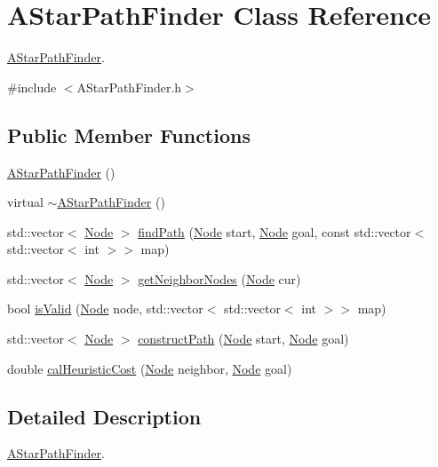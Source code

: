 \hypertarget{classAStarPathFinder}{}\section{A\+Star\+Path\+Finder Class Reference}
\label{classAStarPathFinder}


\hyperlink{classAStarPathFinder}{A\+Star\+Path\+Finder}.  




{\ttfamily \#include $<$A\+Star\+Path\+Finder.\+h$>$}

\subsection*{Public Member Functions}
\begin{DoxyCompactItemize}
\item 
\hyperlink{classAStarPathFinder_adfae926e32955b2c3e43909ad7961a9a}{A\+Star\+Path\+Finder} ()
\item 
virtual \hyperlink{classAStarPathFinder_a3b92e1a0571086969027599fc2a488e5}{$\sim$\+A\+Star\+Path\+Finder} ()
\item 
std\+::vector$<$ \hyperlink{classNode}{Node} $>$ \hyperlink{classAStarPathFinder_a04a5e2e2aae800b324607ecaa0d8248a}{find\+Path} (\hyperlink{classNode}{Node} start, \hyperlink{classNode}{Node} goal, const std\+::vector$<$ std\+::vector$<$ int $>$$>$ map)
\item 
std\+::vector$<$ \hyperlink{classNode}{Node} $>$ \hyperlink{classAStarPathFinder_a9c4397d6069006adb6218b027858859e}{get\+Neighbor\+Nodes} (\hyperlink{classNode}{Node} cur)
\item 
bool \hyperlink{classAStarPathFinder_ade77a8c0b187355d2553cd42b128c2ae}{is\+Valid} (\hyperlink{classNode}{Node} node, std\+::vector$<$ std\+::vector$<$ int $>$$>$ map)
\item 
std\+::vector$<$ \hyperlink{classNode}{Node} $>$ \hyperlink{classAStarPathFinder_aef2b14372e6756807849abf96fa5c058}{construct\+Path} (\hyperlink{classNode}{Node} start, \hyperlink{classNode}{Node} goal)
\item 
double \hyperlink{classAStarPathFinder_ae5e628981264bd57b8e30e9aade75d3f}{cal\+Heuristic\+Cost} (\hyperlink{classNode}{Node} neighbor, \hyperlink{classNode}{Node} goal)
\end{DoxyCompactItemize}


\subsection{Detailed Description}
\hyperlink{classAStarPathFinder}{A\+Star\+Path\+Finder}. 


